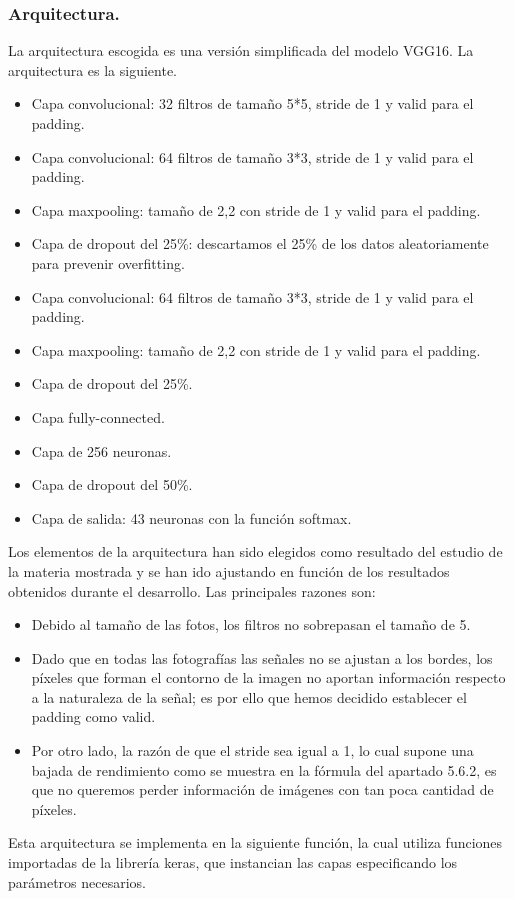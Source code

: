 \documentclass[a4paper,11pt]{article}
\begin{document}
\subsubsection{Arquitectura.}
La arquitectura escogida es una versión simplificada del modelo VGG16. La arquitectura es la siguiente.
\begin{itemize}
\item Capa convolucional: 32 filtros de tamaño 5*5, stride de 1 y valid para el padding.
\item Capa convolucional: 64 filtros de tamaño 3*3, stride de 1 y valid para el padding.
\item Capa maxpooling: tamaño de 2,2 con stride de 1 y valid para el padding.
\item Capa de dropout del 25\%: descartamos el 25\% de los datos aleatoriamente para prevenir overfitting.
\item Capa convolucional: 64 filtros de tamaño 3*3, stride de 1 y valid para el padding.
\item Capa maxpooling: tamaño de 2,2 con stride de 1 y valid para el padding.
\item Capa de dropout del 25\%.
\item Capa fully-connected.
\item Capa de 256 neuronas.
\item Capa de dropout del 50\%.
\item Capa de salida: 43 neuronas con la función softmax.
\end{itemize}
Los elementos de la arquitectura han sido elegidos como resultado del estudio de la materia mostrada y se han ido ajustando en función de los resultados obtenidos durante el desarrollo. Las principales razones son:
\begin{itemize}
\item Debido al tamaño de las fotos, los filtros no sobrepasan el tamaño de 5. 
\item Dado que en todas las fotografías las señales no se ajustan a los bordes, los píxeles que forman el contorno de la imagen no aportan información respecto a la naturaleza de la señal; es por ello que hemos decidido establecer el padding como valid.
\item Por otro lado, la razón de que el stride sea igual a 1, lo cual supone una bajada de rendimiento como se muestra en la fórmula del apartado 5.6.2, es que no queremos perder información de imágenes con tan poca cantidad de píxeles.
\end{itemize}
\noindent
Esta arquitectura se implementa en la siguiente función, la cual utiliza funciones importadas de la librería keras, que instancian las capas especificando los parámetros necesarios.
\end{document}
